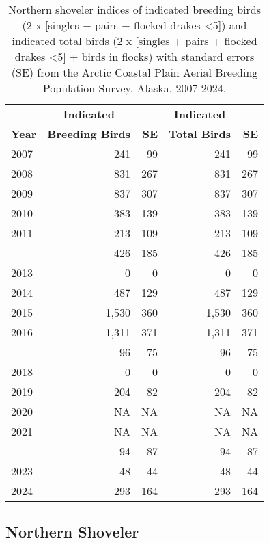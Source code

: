 \documentclass[
]{article}
\begin{document}
\begin{longtable}[t]{lrrrr}
\caption{Northern shoveler indices of indicated breeding birds (2 x [singles + pairs + flocked drakes <5]) and indicated total birds (2 x [singles + pairs + flocked drakes <5] + birds in flocks) with standard errors (SE) from the Arctic Coastal Plain Aerial Breeding Population Survey, Alaska, 2007-2024.}\\
\toprule
\multicolumn{1}{c}{\textbf{ }} & \multicolumn{1}{c}{\textbf{Indicated}} & \multicolumn{1}{c}{\textbf{ }} & \multicolumn{1}{c}{\textbf{Indicated}} & \multicolumn{1}{c}{\textbf{ }} \\
\cmidrule(l{3pt}r{3pt}){2-2} \cmidrule(l{3pt}r{3pt}){4-4}
\textbf{Year} & \textbf{Breeding Birds} & \textbf{SE} & \textbf{Total Birds} & \textbf{SE}\\
\midrule
2007 & 241 & 99 & 241 & 99\\
2008 & 831 & 267 & 831 & 267\\
2009 & 837 & 307 & 837 & 307\\
2010 & 383 & 139 & 383 & 139\\
2011 & 213 & 109 & 213 & 109\\
\addlinespace
2012 & 426 & 185 & 426 & 185\\
2013 & 0 & 0 & 0 & 0\\
2014 & 487 & 129 & 487 & 129\\
2015 & 1,530 & 360 & 1,530 & 360\\
2016 & 1,311 & 371 & 1,311 & 371\\
\addlinespace
2017 & 96 & 75 & 96 & 75\\
2018 & 0 & 0 & 0 & 0\\
2019 & 204 & 82 & 204 & 82\\
2020 & NA & NA & NA & NA\\
2021 & NA & NA & NA & NA\\
\addlinespace
2022 & 94 & 87 & 94 & 87\\
2023 & 48 & 44 & 48 & 44\\
2024 & 293 & 164 & 293 & 164\\
\bottomrule
\end{longtable}
\endgroup{}

\newpage{}

\subsection*{Northern Shoveler}\label{northern-shoveler-2}
\end{document}
